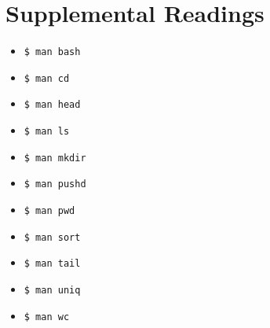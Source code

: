 \section{Supplemental Readings}

\begin{multicols}{2}
\begin{itemize}
  \item \texttt{\$ man bash}
  \item \texttt{\$ man cd}
  \item \texttt{\$ man head}
  \item \texttt{\$ man ls}
  \item \texttt{\$ man mkdir}
  \item \texttt{\$ man pushd}
  \item \texttt{\$ man pwd}
  \item \texttt{\$ man sort}
  \item \texttt{\$ man tail}
  \item \texttt{\$ man uniq}
  \item \texttt{\$ man wc}
\end{itemize}
\end{multicols}
